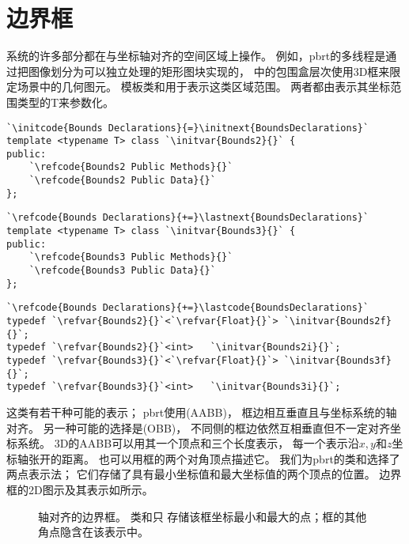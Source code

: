 \section{边界框}\label{sec:边界框}

系统的许多部分都在与坐标轴对齐的空间区域上操作。
例如，pbrt的多线程是通过把图像划分为可以独立处理的矩形图块实现的，
中的包围盒层次使用3D框来限定场景中的几何图元。
模板类和用于表示这类区域范围。
两者都由表示其坐标范围类型的{\ttfamily T}来参数化。
\begin{lstlisting}
`\initcode{Bounds Declarations}{=}\initnext{BoundsDeclarations}`
template <typename T> class `\initvar{Bounds2}{}` {
public:
    `\refcode{Bounds2 Public Methods}{}`
    `\refcode{Bounds2 Public Data}{}`
};
\end{lstlisting}
\begin{lstlisting}
`\refcode{Bounds Declarations}{+=}\lastnext{BoundsDeclarations}`
template <typename T> class `\initvar{Bounds3}{}` {
public:
    `\refcode{Bounds3 Public Methods}{}`
    `\refcode{Bounds3 Public Data}{}`
};
\end{lstlisting}
\begin{lstlisting}
`\refcode{Bounds Declarations}{+=}\lastcode{BoundsDeclarations}`
typedef `\refvar{Bounds2}{}`<`\refvar{Float}{}`> `\initvar{Bounds2f}{}`;
typedef `\refvar{Bounds2}{}`<int>   `\initvar{Bounds2i}{}`;
typedef `\refvar{Bounds3}{}`<`\refvar{Float}{}`> `\initvar{Bounds3f}{}`;
typedef `\refvar{Bounds3}{}`<int>   `\initvar{Bounds3i}{}`;
\end{lstlisting}

这类有若干种可能的表示；
pbrt使用(AABB)，
框边相互垂直且与坐标系统的轴对齐。
另一种可能的选择是(OBB)，
不同侧的框边依然互相垂直但不一定对齐坐标系统。
3D的AABB可以用其一个顶点和三个长度表示，
每一个表示沿$x,y$和$z$坐标轴张开的距离。
也可以用框的两个对角顶点描述它。
我们为pbrt的类和选择了两点表示法；
它们存储了具有最小坐标值和最大坐标值的两个顶点的位置。
边界框的2D图示及其表示如所示。
\begin{figure}[htbp]
    \centering
    \caption{轴对齐的边界框。
        类\protect{}和\protect{}只
        存储该框坐标最小和最大的点；框的其他角点隐含在该表示中。}
    \label{fig:2.8}
\end{figure}

